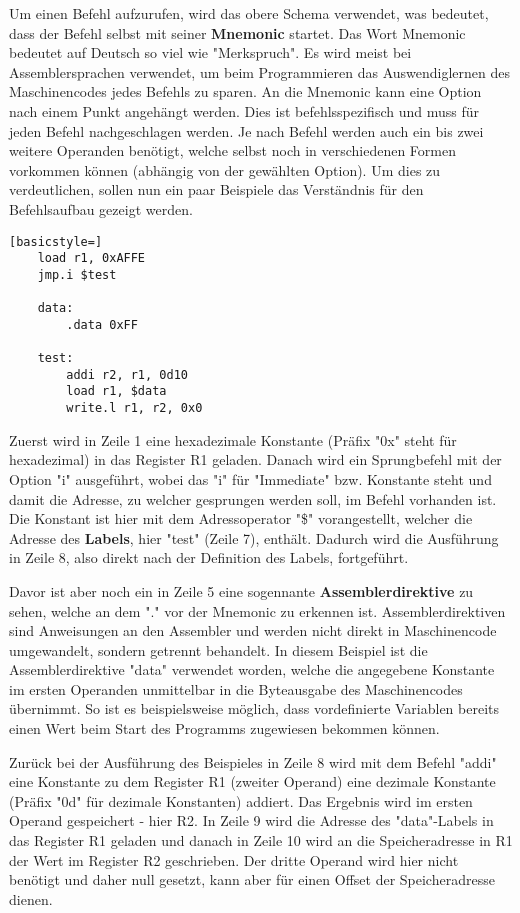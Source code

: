 Um einen Befehl aufzurufen, wird das obere Schema verwendet, was bedeutet, dass
der Befehl selbst mit seiner \textbf{Mnemonic} startet. Das Wort Mnemonic
bedeutet auf Deutsch so viel wie "Merkspruch". Es wird meist bei
Assemblersprachen verwendet, um beim Programmieren das Auswendiglernen des
Maschinencodes jedes Befehls zu sparen. An die Mnemonic kann eine Option nach
einem Punkt angehängt werden. Dies ist befehlsspezifisch und muss für jeden
Befehl nachgeschlagen werden. Je nach Befehl werden auch ein bis zwei weitere
Operanden benötigt, welche selbst noch in verschiedenen Formen vorkommen können
(abhängig von der gewählten Option). Um dies zu verdeutlichen, sollen nun ein
paar Beispiele das Verständnis für den Befehlsaufbau gezeigt werden.
\begin{lstlisting}[basicstyle=]
	load r1, 0xAFFE
	jmp.i $test

	data:
		.data 0xFF

	test:
		addi r2, r1, 0d10
		load r1, $data
		write.l r1, r2, 0x0
\end{lstlisting}
Zuerst wird in Zeile 1 eine hexadezimale Konstante (Präfix "0x" steht für
hexadezimal) in das Register R1 geladen. Danach wird ein Sprungbefehl mit der
Option "i" ausgeführt, wobei das "i" für "Immediate" bzw. Konstante steht und
damit die Adresse, zu welcher gesprungen werden soll, im Befehl vorhanden ist.
Die Konstant ist hier mit dem Adressoperator "\$" vorangestellt, welcher die
Adresse des \textbf{Labels}, hier "test" (Zeile 7), enthält. Dadurch wird die
Ausführung in Zeile 8, also direkt nach der Definition des Labels, fortgeführt.

Davor ist aber noch ein in Zeile 5 eine sogennante \textbf{Assemblerdirektive}
zu sehen, welche an dem "." vor der Mnemonic zu erkennen ist.
Assemblerdirektiven sind Anweisungen an den Assembler und werden nicht direkt in
Maschinencode umgewandelt, sondern getrennt behandelt. In diesem Beispiel ist
die Assemblerdirektive "data" verwendet worden, welche die angegebene Konstante
im ersten Operanden unmittelbar in die Byteausgabe des Maschinencodes übernimmt.
So ist es beispielsweise möglich, dass vordefinierte Variablen bereits einen
Wert beim Start des Programms zugewiesen bekommen können.

Zurück bei der Ausführung des Beispieles in Zeile 8 wird mit dem Befehl "addi"
eine Konstante zu dem Register R1 (zweiter Operand) eine dezimale Konstante
(Präfix "0d" für dezimale Konstanten) addiert. Das Ergebnis wird im ersten
Operand gespeichert - hier R2. In Zeile 9 wird die Adresse des "data"-Labels in
das Register R1 geladen und danach in Zeile 10 wird an die Speicheradresse in R1
der Wert im Register R2 geschrieben. Der dritte Operand wird hier nicht benötigt
und daher null gesetzt, kann aber für einen Offset der Speicheradresse dienen.
\pagebreak
